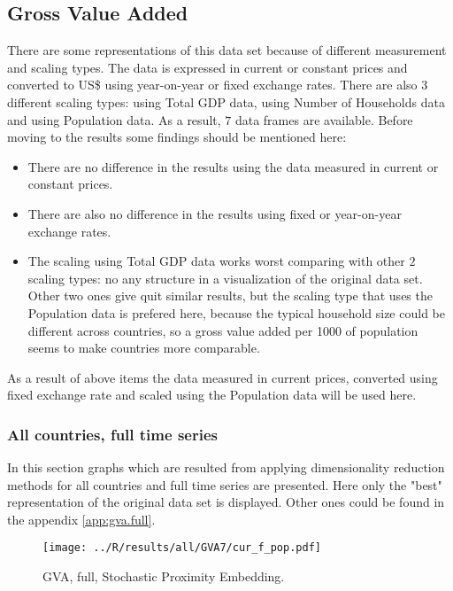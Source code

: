 \documentclass[a4paper]{article}
\begin{document}
\subsection{Gross Value Added}
There are some representations of this data set because of different
measurement and scaling types. The data is expressed in
current or constant prices and converted to US\$ using year-on-year or
fixed exchange rates. There are also $3$ different scaling types:
using Total GDP data, using Number of Households data and using
Population data. As a result, $7$ data frames are available. Before
moving to the results some findings should be mentioned here:

\begin{itemize}
\label{item:gva}
  \item There are no difference in the results using the data
    measured in current or constant prices.
  \item There are also no difference in the results using fixed or
    year-on-year exchange rates.
  \item The scaling using Total GDP data works worst comparing
    with other $2$ scaling types: no any structure in a visualization of
    the original data set. Other two ones give quit similar results,
    but the scaling type that uses the Population
    data is prefered here, because the typical household size could be
    different across countries, so a gross value added per 1000 of
    population seems to make countries more comparable.
\end{itemize}
As a result of above items the data measured in current prices,
converted using fixed exchange rate and scaled using the Population
data will be used here.
\newpage
\subsubsection{All countries, full time series}
In this section graphs which are resulted from applying dimensionality reduction
methods for all countries and full time series are presented. Here
only the "best" representation of the original data set is
displayed. Other ones could be found in the appendix \ref{app:gva.full}.

\begin{figure}[!htbp]
\begin{center}
\texttt{[image: ../R/results/all/GVA7/cur\_f\_pop.pdf]}
\caption{GVA, full, Stochastic Proximity Embedding.}
\label{fig:gva.spe}
\end{center}
\end{figure}
\end{document}
